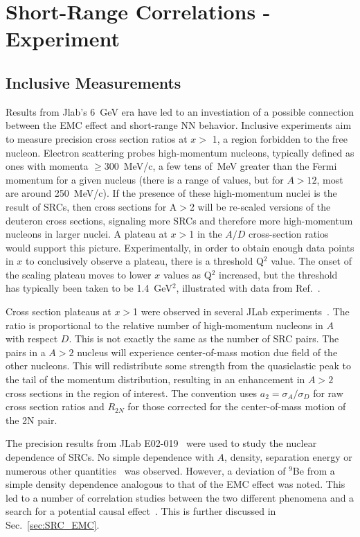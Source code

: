 \section{Short-Range Correlations - Experiment}
\subsection{Inclusive Measurements}
Results from Jlab's 6~GeV era have led to an investiation of a possible connection between the EMC effect and short-range NN behavior.  Inclusive experiments aim to measure precision cross section ratios at $x >$ 1, a region forbidden to the free nucleon.   Electron scattering probes high-momentum nucleons, typically defined as ones with momenta $\ge$300~MeV/c, a few tens of~MeV greater than the Fermi momentum for a given nucleus (there is a range of values, but for $A>12$, most are around 250~MeV/c). If the presence of these high-momentum nuclei is the result of SRCs, then cross sections for A$>$2 will be re-scaled versions of the deuteron cross sections, signaling more SRCs and therefore more high-momentum nucleons in larger nuclei.   A plateau at $x>$1 in the $A/D$ cross-section ratios would support this picture.    Experimentally, in order to obtain enough data points in $x$ to conclusively observe a plateau, there is a threshold Q$^2$ value.  The onset of the scaling plateau moves to lower $x$ values as Q$^2$ increased, but the threshold has typically been taken to be 1.4~GeV$^2$, illustrated with data from Ref.~\cite{Egiyan:2003vg}.

Cross section plateaus at $x>$1 were observed in several JLab experiments~\cite{Egiyan:2003vg, Fomin:2011ng}.  The ratio is proportional to the relative number of high-momentum nucleons in $A$ with respect $D$.  This is not exactly the same as the number of SRC pairs.   The pairs in a $A>2$ nucleus will experience center-of-mass motion due field of the other nucleons.  This will redistribute some strength from the quasielastic peak to the tail of the momentum distribution, resulting in an enhancement in $A>2$ cross sections in the region of interest.  The convention uses $a_2=\sigma_A/\sigma_D$ for raw cross section ratios and $R_{2N}$ for those corrected for the center-of-mass motion of the 2N pair. 


The precision results from JLab E02-019~\cite{Fomin:2011ng} were used to study the nuclear dependence of SRCs. No simple dependence with $A$, density, separation energy or numerous other quantities~\cite{PhysRevC.86.065204} was observed.  However, a deviation of $^9$Be from a simple density dependence analogous to that of the EMC effect was noted.  This led to a number of correlation studies between the two different phenomena and a search for a potential causal effect~\cite{PhysRevC.86.065204, Hen:2012fm, Weinstein:2010rt}.  This is further discussed in Sec.~\ref{sec:SRC_EMC}.

